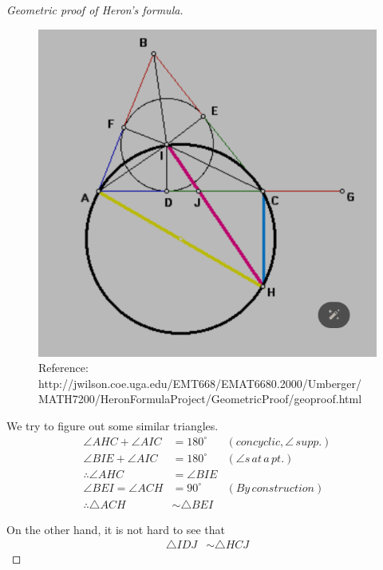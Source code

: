 \documentclass[12pt]{article}
\begin{document}
\begin{proof}[Geometric proof of Heron's formula]
        \begin{figure}[H]
            \centering
            \includegraphics[scale=1.5]{heron_circle.png}
            \caption{Reference: http://jwilson.coe.uga.edu/EMT668/EMAT6680.2000/Umberger/\\MATH7200/HeronFormulaProject/GeometricProof/geoproof.html}
        \end{figure}

        We try to figure out some similar triangles.\begin{align*}
            \angle AHC + \angle AIC &= 180^\circ &(concyclic, \angle \, supp.)\\
            \angle BIE + \angle AIC &= 180^\circ &(\angle s\, at\, a\, pt.)\\
            \therefore \angle AHC &= \angle BIE\\
            \angle BEI = \angle ACH &= 90^\circ &(By \, construction)\\
            \therefore \triangle ACH &\sim \triangle BEI
        \end{align*}

        On the other hand, it is not hard to see that \begin{align*}
            \triangle IDJ &\sim \triangle HCJ
        \end{align*}


\end{proof}
\end{document}
